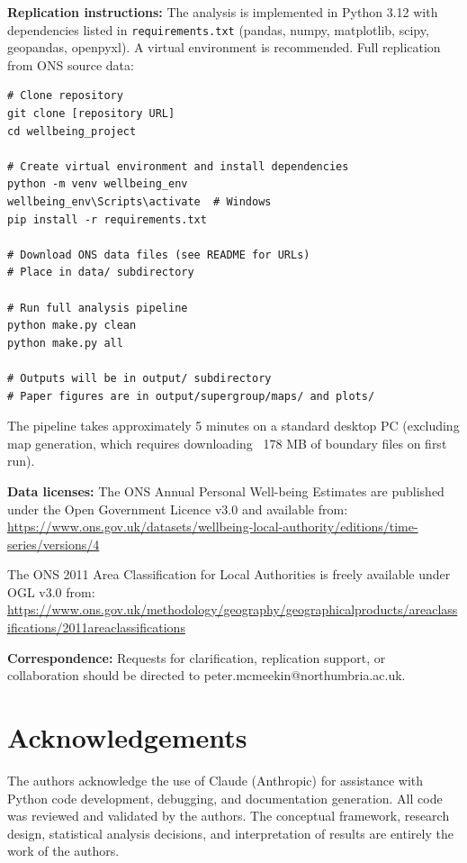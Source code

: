 \documentclass[12pt,a4paper]{article}
\begin{document}
\textbf{Replication instructions:} The analysis is implemented in Python 3.12 with dependencies listed in \texttt{requirements.txt} (pandas, numpy, matplotlib, scipy, geopandas, openpyxl). A virtual environment is recommended. Full replication from ONS source data:

\begin{verbatim}
# Clone repository
git clone [repository URL]
cd wellbeing_project

# Create virtual environment and install dependencies
python -m venv wellbeing_env
wellbeing_env\Scripts\activate  # Windows
pip install -r requirements.txt

# Download ONS data files (see README for URLs)
# Place in data/ subdirectory

# Run full analysis pipeline
python make.py clean
python make.py all

# Outputs will be in output/ subdirectory
# Paper figures are in output/supergroup/maps/ and plots/
\end{verbatim}

The pipeline takes approximately 5 minutes on a standard desktop PC (excluding map generation, which requires downloading ~178 MB of boundary files on first run).

\textbf{Data licenses:} The ONS Annual Personal Well-being Estimates are published under the Open Government Licence v3.0 and available from: \url{https://www.ons.gov.uk/datasets/wellbeing-local-authority/editions/time-series/versions/4}

The ONS 2011 Area Classification for Local Authorities is freely available under OGL v3.0 from: \url{https://www.ons.gov.uk/methodology/geography/geographicalproducts/areaclassifications/2011areaclassifications}

\textbf{Correspondence:} Requests for clarification, replication support, or collaboration should be directed to peter.mcmeekin@northumbria.ac.uk.

\section*{Acknowledgements}

The authors acknowledge the use of Claude (Anthropic) for assistance with Python code development, debugging, and documentation generation. All code was reviewed and validated by the authors. The conceptual framework, research design, statistical analysis decisions, and interpretation of results are entirely the work of the authors.
\end{document}
